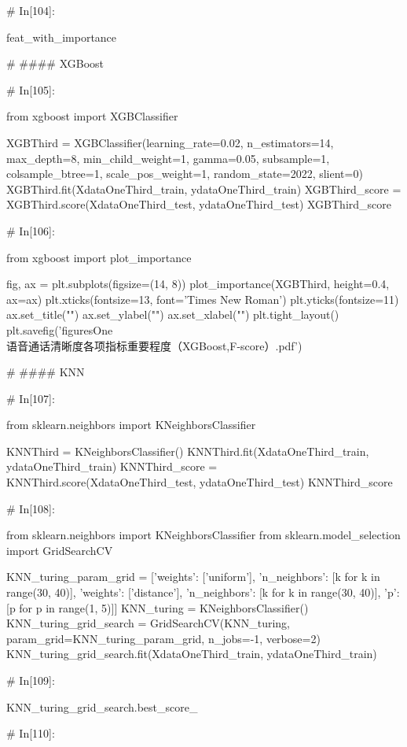 \documentclass{MathorCupmodeling}
\begin{document}
\begin{python}
	# In[104]:
	
	
	feat_with_importance
	
	# #### XGBoost
	
	# In[105]:
	
	
	from xgboost import XGBClassifier
	
	XGBThird = XGBClassifier(learning_rate=0.02,
							 n_estimators=14,
							 max_depth=8,
							 min_child_weight=1,
							 gamma=0.05,
							 subsample=1,
							 colsample_btree=1,
							 scale_pos_weight=1,
							 random_state=2022,
							 slient=0)
	XGBThird.fit(XdataOneThird_train, ydataOneThird_train)
	XGBThird_score = XGBThird.score(XdataOneThird_test, ydataOneThird_test)
	XGBThird_score
	
	# In[106]:
	
	
	from xgboost import plot_importance
	
	fig, ax = plt.subplots(figsize=(14, 8))
	plot_importance(XGBThird, height=0.4, ax=ax)
	plt.xticks(fontsize=13, font='Times New Roman')
	plt.yticks(fontsize=11)
	ax.set_title("")
	ax.set_ylabel("")
	ax.set_xlabel("")
	plt.tight_layout()
	plt.savefig('figuresOne\\[附件1]语音通话清晰度各项指标重要程度（XGBoost,F-score）.pdf')
	
	# #### KNN
	
	# In[107]:
	
	
	from sklearn.neighbors import KNeighborsClassifier
	
	KNNThird = KNeighborsClassifier()
	KNNThird.fit(XdataOneThird_train, ydataOneThird_train)
	KNNThird_score = KNNThird.score(XdataOneThird_test, ydataOneThird_test)
	KNNThird_score
	
	# In[108]:
	
	
	from sklearn.neighbors import KNeighborsClassifier
	from sklearn.model_selection import GridSearchCV
	
	KNN_turing_param_grid = [{'weights': ['uniform'],
							  'n_neighbors': [k for k in range(30, 40)]},
							 {'weights': ['distance'],
							  'n_neighbors': [k for k in range(30, 40)],
							  'p': [p for p in range(1, 5)]}]
	KNN_turing = KNeighborsClassifier()
	KNN_turing_grid_search = GridSearchCV(KNN_turing,
										  param_grid=KNN_turing_param_grid,
										  n_jobs=-1,
										  verbose=2)
	KNN_turing_grid_search.fit(XdataOneThird_train, ydataOneThird_train)
	
	# In[109]:
	
	
	KNN_turing_grid_search.best_score_
	
	# In[110]:
	

\end{python}
\end{document}
